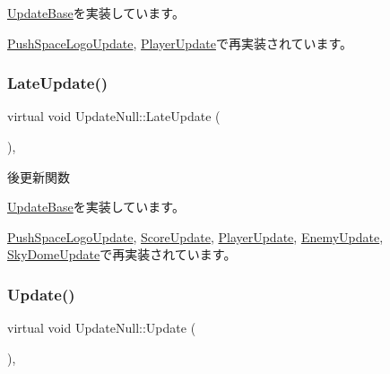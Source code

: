 \mbox{\hyperlink{class_update_base_a5c63c3c3ef1b85f3701718ec3f7b39e2}{Update\+Base}}を実装しています。



\mbox{\hyperlink{class_push_space_logo_update_ab18a0c905455da17f9e2f1fe5f0c34e6}{Push\+Space\+Logo\+Update}}, \mbox{\hyperlink{class_player_update_ac15fd0faf356c6e66f6c62c2b6b8d3ac}{Player\+Update}}で再実装されています。

\mbox{\label{class_update_null_ac68da1ba7f3fbcae833442bb1c169200}} 
\subsubsection{\texorpdfstring{Late\+Update()}{LateUpdate()}}
{\footnotesize\ttfamily virtual void Update\+Null\+::\+Late\+Update (\begin{DoxyParamCaption}{ }\end{DoxyParamCaption})\hspace{0.3cm}{\ttfamily [inline]}, {\ttfamily [virtual]}}



後更新関数 



\mbox{\hyperlink{class_update_base_afc4956f78135aed5fc4e4f9991be50b9}{Update\+Base}}を実装しています。



\mbox{\hyperlink{class_push_space_logo_update_a4423864fb22b1211e92a4317d0b70a44}{Push\+Space\+Logo\+Update}}, \mbox{\hyperlink{class_score_update_adc9a48f54828e49c072c298777935893}{Score\+Update}}, \mbox{\hyperlink{class_player_update_ae376f517f3458edfef61ac366aa78e36}{Player\+Update}}, \mbox{\hyperlink{class_enemy_update_ae14e4ebb42ad9043534e53edcba5b242}{Enemy\+Update}}, \mbox{\hyperlink{class_sky_dome_update_a94347cb50b4dc13528738a7b812da261}{Sky\+Dome\+Update}}で再実装されています。

\mbox{\label{class_update_null_a692f4f34e4ef35ca286a1d3606fdf473}} 
\subsubsection{\texorpdfstring{Update()}{Update()}}
{\footnotesize\ttfamily virtual void Update\+Null\+::\+Update (\begin{DoxyParamCaption}{ }\end{DoxyParamCaption})\hspace{0.3cm}{\ttfamily [inline]}, {\ttfamily [virtual]}}



